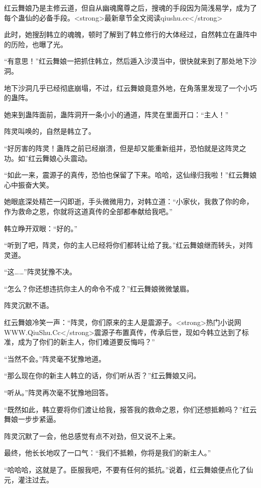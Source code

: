 
\begin{this_body}

红云舞娘乃是主修云道，但自从幽魂魔尊之后，搜魂的手段因为简浅易学，成为了每个蛊仙的必备手段。<strong>最新章节全文阅读qiushu.cc</strong>

此时，她搜刮韩立的魂魄，顿时了解到了韩立修行的大体经过，自然韩立在蛊阵中的历险，也曝了光。

“有意思！”红云舞娘一把抓住韩立，然后遁入沙漠当中，很快就来到了那处地下沙洞。

地下沙洞几乎已经彻底崩塌，不过，红云舞娘竟意外地，在角落里发现了一个小巧的蛊阵。

她来到蛊阵面前，蛊阵洞开一条小小的通道，阵灵在里面开口：“主人！”

阵灵叫唤的，自然是韩立了。

“好厉害的阵灵！蛊阵之前已经崩溃，但是却又能重新组并，恐怕就是这阵灵之功。如”红云舞娘心头震动。

“如此一来，震源子的真传，恐怕也保留了下来。哈哈，这仙缘归我啦！”红云舞娘心中振奋大笑。

她眼底深处精芒一闪即逝，手头微微用力，对韩立道：“小家伙，我救了你的命，作为救命之恩，你就将这道真传的全部都奉献给我吧。”

韩立睁开双眼：“好的。”

“听到了吧，阵灵，你的主人已经将你们都转让给了我。”红云舞娘继而转头，对阵灵道。

“这……”阵灵犹豫不决。

“怎么？你还想违抗你主人的命令不成？”红云舞娘微微皱眉。

阵灵沉默不语。

红云舞娘冷笑一声：“阵灵，你们原来的主人是震源子。<strong>热门小说网WWW.QiuShu.Cc</strong>震源子布置真传，传承后世，现如今韩立达到了标准，成为了你们的新主人，你们难道要反悔吗？”

“当然不会。”阵灵毫不犹豫地道。

“那么现在你的新主人韩立的话，你们听从否？”红云舞娘又问。

“听从。”阵灵再次毫不犹豫地回答。

“既然如此，韩立要将你们渡让给我，报答我的救命之恩，你们还想抵赖吗？”红云舞娘一步步紧逼。

阵灵沉默了一会，他总感觉有点不对劲，但又说不上来。

最终，他长长地叹了一口气：“我们不抵赖，你将是我们的新主人。”

“哈哈哈，这就是了。臣服我吧，不要有任何的抵抗。”说着，红云舞娘便点化了仙元，灌注过去。


\end{this_body}
